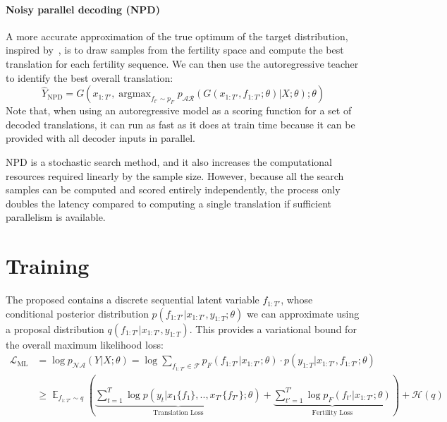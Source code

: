 \documentclass{article} \usepackage{iclr2018_conference,times}
\DeclareMathOperator*{\argmax}{argmax} \DeclareMathOperator*{\argminB}{argmin}   \DeclareMathOperator*{\argminC}{\arg\min}
\begin{document}
\paragraph{Noisy parallel decoding (NPD)} A more accurate approximation of the true optimum of the target distribution, inspired by~\citet{cho2016noisy}, is to draw samples from the fertility space and compute the best translation for each fertility sequence.
We can then use the autoregressive teacher to identify the best overall translation:
\begin{equation}
\hat{Y}_\text{NPD} = G(x_{1:T'}, \argmax_{f_{t'} \sim p_F} p_{\mathcal{AR}}(G(x_{1:T'}, f_{1:T'};\theta)|X;\theta);\theta)
\end{equation}
Note that, when using an autoregressive model as a scoring function for a set of decoded translations, it can run as fast as it does at train time because it can be provided with all decoder inputs in parallel.

NPD is a stochastic search method, and it also increases the computational resources required linearly by the sample size. However, because all the search samples can be computed and scored entirely independently, the process only doubles the latency compared to computing a single translation if sufficient parallelism is available.


\section{Training}
The proposed \model{} contains a discrete sequential latent variable $f_{1:T'}$, whose conditional posterior distribution $p(f_{1:T'} | x_{1:T'}, y_{1:T}; \theta)$ we can approximate using a proposal distribution $q(f_{1:T'} | x_{1:T'}, y_{1:T})$. This provides a variational bound for the overall maximum likelihood loss:
\begin{equation}
\label{eq.variational}
\begin{split}
\mathcal{L}_{\text{ML}} &= \log p_{\mathcal{NA}}(Y|X; \theta) = \log \sum_{f_{1:T'}\in \mathcal{F}}{p_F(f_{1:T'}|x_{1:T'}; \theta)\cdot p(y_{1:T} | x_{1:T'}, f_{1:T'}; \theta)} \\
&\geq \mathop{\mathbb{E}}_{f_{1:T'} \sim q}\left(\underbrace{\sum_{t=1}^T\log p(y_t| x_1\{f_1\}, .., x_{T'}\{f_{T'}\}; \theta)}_{\text{Translation Loss}} + \underbrace{\sum_{t'=1}^{T'}\log p_F(f_{t'}|x_{1:T'}; \theta)}_{\text{Fertility Loss}} \right) + \mathcal{H}(q)
\end{split}
\end{equation}
\end{document}
